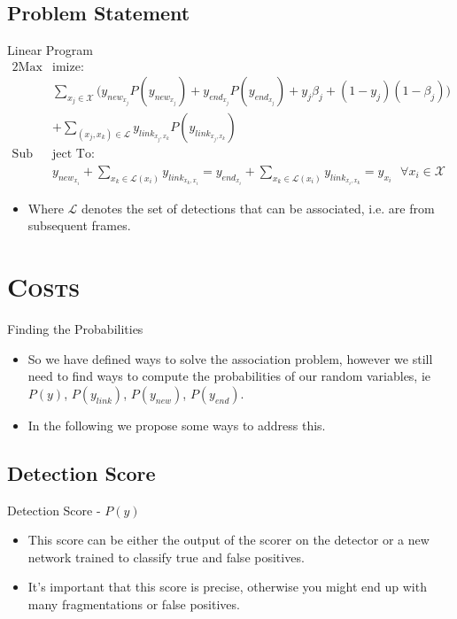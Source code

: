 \subsection{Problem Statement}
\begin{frame}{Linear Program}
	\\[-2ex]
\begin{alignat*}{2}
	\label{eq:linear_problem}
	 \text{Max}&\text{imize: }\\
	 & \sum_{x_j \in \mathcal{X}} \Bigg( y_{new_{x_j}} P(y_{new_{x_j}}) + y_{end_{x_j}} P(y_{end_{x_j}}) + y_j \beta_j + (1-y_j)(1-\beta_j) \Bigg)                                         \\
	 & + \sum_{(x_j,x_k)\in \mathcal{L}}y_{link_{x_j,x_k}}P(y_{link_{x_j,x_k}})\\
	 \text{Sub}&\text{ject To: }\\
	 & y_{new_{x_i}} + \sum_{x_k \in \mathcal{L}(x_i)} y_{link_{x_k,x_i}} = y_{end_{x_i}} + \sum_{x_k \in \mathcal{L}(x_i)} y_{link_{x_i,x_k}} = y_{x_i} \ \ \ \forall x_i \in \mathcal{X}
\end{alignat*}
\begin{itemize}
	\item Where $\mathcal{L}$ denotes the set of detections that can be associated, i.e. are from subsequent frames.
\end{itemize}
\end{frame}


\section{\scshape Costs}
\begin{frame}{Finding the Probabilities}
\begin{itemize}
	\item So we have defined ways to solve the association problem, however we still need to find ways to compute the probabilities of our random variables, ie $P(y)$, $P(y_{link})$, $P(y_{new})$, $P(y_{end})$.
	\item In the following we propose some ways to address this.
\end{itemize}
\end{frame}


\subsection{Detection Score}
\begin{frame}{Detection Score - $P(y)$}
\begin{itemize}
	\item This score can be either the output of the scorer on the detector or a new network trained to classify true and false positives.
	\item It's important that this score is precise, otherwise you might end up with many fragmentations or false positives.
\end{itemize}
\end{frame}


